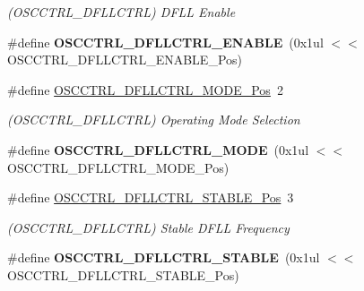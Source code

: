 \begin{DoxyCompactItemize}
\begin{DoxyCompactList}\small\item\em (O\+S\+C\+C\+T\+R\+L\+\_\+\+D\+F\+L\+L\+C\+T\+R\+L) D\+F\+L\+L Enable \end{DoxyCompactList}\item 
\hypertarget{group___s_a_m_l21___o_s_c_c_t_r_l_ga6dd6da35f295f176f661476042c1cb62}{}\#define {\bfseries O\+S\+C\+C\+T\+R\+L\+\_\+\+D\+F\+L\+L\+C\+T\+R\+L\+\_\+\+E\+N\+A\+B\+L\+E}~(0x1ul $<$$<$ O\+S\+C\+C\+T\+R\+L\+\_\+\+D\+F\+L\+L\+C\+T\+R\+L\+\_\+\+E\+N\+A\+B\+L\+E\+\_\+\+Pos)\label{group___s_a_m_l21___o_s_c_c_t_r_l_ga6dd6da35f295f176f661476042c1cb62}

\item 
\hypertarget{group___s_a_m_l21___o_s_c_c_t_r_l_ga38b2f196661273abbff035fafad95b3f}{}\#define \hyperlink{group___s_a_m_l21___o_s_c_c_t_r_l_ga38b2f196661273abbff035fafad95b3f}{O\+S\+C\+C\+T\+R\+L\+\_\+\+D\+F\+L\+L\+C\+T\+R\+L\+\_\+\+M\+O\+D\+E\+\_\+\+Pos}~2\label{group___s_a_m_l21___o_s_c_c_t_r_l_ga38b2f196661273abbff035fafad95b3f}

\begin{DoxyCompactList}\small\item\em (O\+S\+C\+C\+T\+R\+L\+\_\+\+D\+F\+L\+L\+C\+T\+R\+L) Operating Mode Selection \end{DoxyCompactList}\item 
\hypertarget{group___s_a_m_l21___o_s_c_c_t_r_l_gada8b272656040d5dbba5dfe1da45eaa2}{}\#define {\bfseries O\+S\+C\+C\+T\+R\+L\+\_\+\+D\+F\+L\+L\+C\+T\+R\+L\+\_\+\+M\+O\+D\+E}~(0x1ul $<$$<$ O\+S\+C\+C\+T\+R\+L\+\_\+\+D\+F\+L\+L\+C\+T\+R\+L\+\_\+\+M\+O\+D\+E\+\_\+\+Pos)\label{group___s_a_m_l21___o_s_c_c_t_r_l_gada8b272656040d5dbba5dfe1da45eaa2}

\item 
\hypertarget{group___s_a_m_l21___o_s_c_c_t_r_l_gaa4d2ebb2e81f2d05f990cffdabf08069}{}\#define \hyperlink{group___s_a_m_l21___o_s_c_c_t_r_l_gaa4d2ebb2e81f2d05f990cffdabf08069}{O\+S\+C\+C\+T\+R\+L\+\_\+\+D\+F\+L\+L\+C\+T\+R\+L\+\_\+\+S\+T\+A\+B\+L\+E\+\_\+\+Pos}~3\label{group___s_a_m_l21___o_s_c_c_t_r_l_gaa4d2ebb2e81f2d05f990cffdabf08069}

\begin{DoxyCompactList}\small\item\em (O\+S\+C\+C\+T\+R\+L\+\_\+\+D\+F\+L\+L\+C\+T\+R\+L) Stable D\+F\+L\+L Frequency \end{DoxyCompactList}\item 
\hypertarget{group___s_a_m_l21___o_s_c_c_t_r_l_ga5d9a07689780337ff97792443f5efd36}{}\#define {\bfseries O\+S\+C\+C\+T\+R\+L\+\_\+\+D\+F\+L\+L\+C\+T\+R\+L\+\_\+\+S\+T\+A\+B\+L\+E}~(0x1ul $<$$<$ O\+S\+C\+C\+T\+R\+L\+\_\+\+D\+F\+L\+L\+C\+T\+R\+L\+\_\+\+S\+T\+A\+B\+L\+E\+\_\+\+Pos)\label{group___s_a_m_l21___o_s_c_c_t_r_l_ga5d9a07689780337ff97792443f5efd36}


\end{DoxyCompactItemize}
